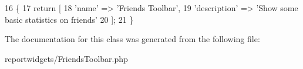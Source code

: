 \begin{DoxyCode}
16     \{
17         \textcolor{keywordflow}{return} [
18             \textcolor{stringliteral}{'name'}        => \textcolor{stringliteral}{'Friends Toolbar'},
19             \textcolor{stringliteral}{'description'} => \textcolor{stringliteral}{'Show some basic statistics on friends'}
20         ];
21     \}
\end{DoxyCode}


The documentation for this class was generated from the following file\+:\begin{DoxyCompactItemize}
\item 
reportwidgets/Friends\+Toolbar.\+php\end{DoxyCompactItemize}
